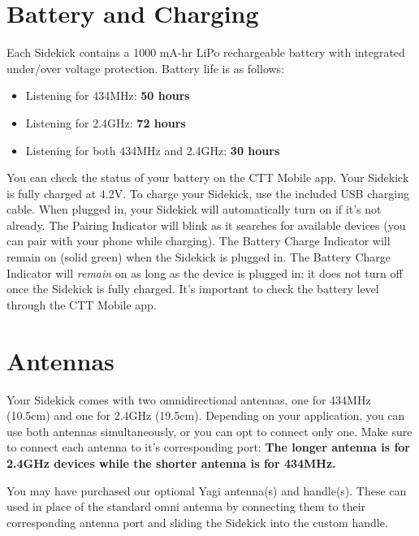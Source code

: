 \documentclass[
]{article}
\providecommand{\tightlist}{%
  \setlength{\itemsep}{0pt}\setlength{\parskip}{0pt}}
\begin{document}
\hypertarget{battery-and-charging}{%
\section{Battery and Charging}\label{battery-and-charging}}

Each Sidekick contains a 1000 mA-hr LiPo rechargeable battery with
integrated under/over voltage protection. Battery life is as follows:

\begin{itemize}
\tightlist
\item
  Listening for 434MHz: \textbf{50 hours}
\item
  Listening for 2.4GHz: \textbf{72 hours}
\item
  Listening for both 434MHz and 2.4GHz: \textbf{30 hours}
\end{itemize}

You can check the status of your battery on the CTT Mobile app. Your
Sidekick is fully charged at 4.2V. To charge your Sidekick, use the
included USB charging cable. When plugged in, your Sidekick will
automatically turn on if it's not already. The Pairing Indicator will
blink as it searches for available devices (you can pair with your phone
while charging). The Battery Charge Indicator will remain on (solid
green) when the Sidekick is plugged in. The Battery Charge Indicator
will \emph{remain} on as long as the device is plugged in; it does not
turn off once the Sidekick is fully charged. It's important to check the
battery level through the CTT Mobile app.

\hypertarget{antennas}{%
\section{Antennas}\label{antennas}}

Your Sidekick comes with two omnidirectional antennas, one for 434MHz
(10.5cm) and one for 2.4GHz (19.5cm). Depending on your application, you
can use both antennas simultaneously, or you can opt to connect only
one. Make sure to connect each antenna to it's corresponding port:
\textbf{The longer antenna is for 2.4GHz devices while the shorter
antenna is for 434MHz.}

You may have purchased our optional Yagi antenna(s) and handle(s). These
can used in place of the standard omni antenna by connecting them to
their corresponding antenna port and sliding the Sidekick into the
custom handle.
\end{document}
